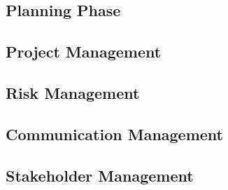 \documentclass[a4paper,12pt]{article}
\begin{document}
\begin{samepage}
\section {Planning Phase}

\subsection {Project Management}
\subsection {Risk Management}
\subsection {Communication Management}
\subsection {Stakeholder Management}
\end{samepage}
\end{document}
